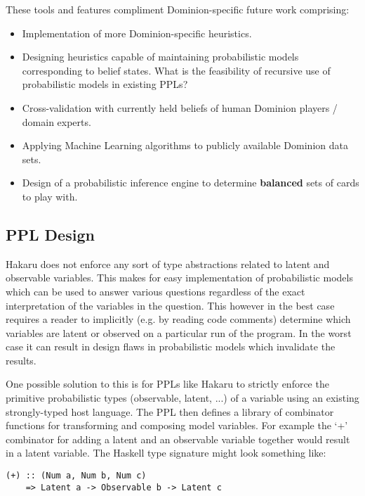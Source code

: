 These tools and features compliment Dominion-specific future
work comprising:

\begin{itemize}
\item Implementation of more Dominion-specific heuristics.
\item Designing heuristics capable of maintaining probabilistic models
      corresponding to belief states. What is the feasibility of recursive
      use of probabilistic models in existing PPLs?
\item Cross-validation with currently held beliefs of human Dominion
      players / domain experts. \cite{human-card-comparisons}
\item Applying Machine Learning algorithms to publicly available Dominion
      data sets. \cite{dominion-data-sets}
\item Design of a probabilistic inference engine to determine
      {\bf balanced} sets of cards to play with.
\end{itemize}

\subsection{PPL Design} \label{sec:future:PPL}

Hakaru does not enforce any sort of type abstractions related to latent
and observable variables. This makes for easy implementation of probabilistic
models which can be used to answer various questions regardless of the
exact interpretation of the variables in the question. This however in the
best case requires a reader to implicitly (e.g. by reading code comments)
determine which variables are latent or observed on a particular run of
the program. In the worst case it can result in design flaws in probabilistic
models which invalidate the results.

One possible solution to this is for PPLs like Hakaru
to strictly enforce the primitive probabilistic types (observable,
latent, ...) of a variable using an existing strongly-typed host language.
The PPL then defines a library of combinator functions for transforming
and composing model variables. For example the `+' combinator for adding
a latent and an observable variable together would result in a latent
variable. The Haskell type signature might look something like:

\begin{verbatim}
(+) :: (Num a, Num b, Num c)
    => Latent a -> Observable b -> Latent c
\end{verbatim}

